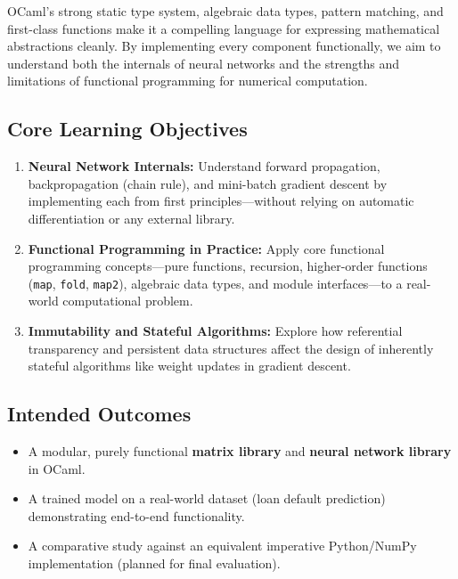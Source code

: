 \documentclass[12pt, a4paper]{article}
\begin{document}
OCaml's strong static type system, algebraic data types, pattern matching, and first-class functions make it a compelling language for expressing mathematical abstractions cleanly. By implementing every component functionally, we aim to understand both the internals of neural networks and the strengths and limitations of functional programming for numerical computation.

\subsection{Core Learning Objectives}

\begin{enumerate}[leftmargin=1.5cm]
    \item \textbf{Neural Network Internals:} Understand forward propagation, backpropagation (chain rule), and mini-batch gradient descent by implementing each from first principles---without relying on automatic differentiation or any external library.
    
    \item \textbf{Functional Programming in Practice:} Apply core functional programming concepts---pure functions, recursion, higher-order functions (\texttt{map}, \texttt{fold}, \texttt{map2}), algebraic data types, and module interfaces---to a real-world computational problem.
    
    \item \textbf{Immutability and Stateful Algorithms:} Explore how referential transparency and persistent data structures affect the design of inherently stateful algorithms like weight updates in gradient descent.
\end{enumerate}

\subsection{Intended Outcomes}

\begin{itemize}[leftmargin=1.5cm]
    \item A modular, purely functional \textbf{matrix library} and \textbf{neural network library} in OCaml.
    \item A trained model on a real-world dataset (loan default prediction) demonstrating end-to-end functionality.
    \item A comparative study against an equivalent imperative Python/NumPy implementation (planned for final evaluation).
\end{itemize}
\end{document}
